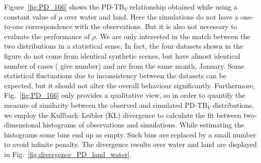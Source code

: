 \documentclass[amt, manuscript]{copernicus}
\newcommand{\todo}[1]{{\color{red} #1}}
\begin{document}

Figure~\ref{fig:PD_166} shows the PD-TB$_V$ relationship obtained while using a constant value of $\rho$ over water and land. Here the simulations do not have a one-to-one correspondence with the observations. But it is also not necessary to evaluate the performance of $\rho$. We are only interested in the match between the two distributions in a statistical sense. In fact, the four datasets shown in the figure do not come from identical synthetic scenes, but have almost identical number of cases (\todo{give number}) and are from the same month, January. Some statistical fluctuations due to inconsistency between the datasets can be expected, but it should not alter the overall behaviour significantly. Furthermore, Fig.~\ref{fig:PD_166} only provides a qualitative view, so in order to quantify the measure of similarity between the observed and simulated PD-TB$_V$ distributions, we employ the Kullback–Leibler (KL) divergence \citep{Joyce:kl:11} to calculate the fit between two-dimensional histograms of observations and simulations. While estimating the histograms some bins end up as empty. Such bins are replaced by a small number to avoid infinite penalty. The divergence results over water and land are displayed in Fig.~\ref{fig:divergence_PD_land_water}.
\end{document}
